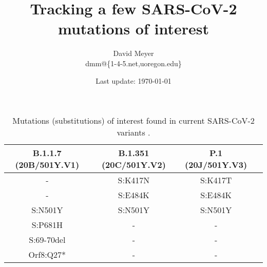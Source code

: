 \documentclass[11pt, oneside]{article}   	%
\title{Tracking a few SARS-CoV-2 mutations of interest}
\author{David Meyer \\ dmm@\{1-4-5.net,uoregon.edu\}}
\date{Last update: \today}							%
\begin{document}
\maketitle


\begin{table} [H]
  \begin{center}
    \begin{tabular}{c|c|c c} 
      \textbf{B.1.1.7  (20B/501Y.V1)} & \textbf{B.1.351 (20C/501Y.V2)} & \textbf{P.1 (20J/501Y.V3)} \\
      \hline 
      \hline 
      - & S:K417N & S:K417T   \\
      - & S:E484K & S:E484K   \\
      S:N501Y & S:N501Y & S:N501Y  \\
      S:P681H & - & - &  \\
      S:69-70del & - &- &  \\
      Orf8:Q27* & - & - &  \\
    \end{tabular}
  \end{center}
 \caption{Mutations (substitutions) of interest found in current SARS-CoV-2 variants  \cite{covid:nextstrain,covid:lineages}.}
\end{table}



\end{document}
